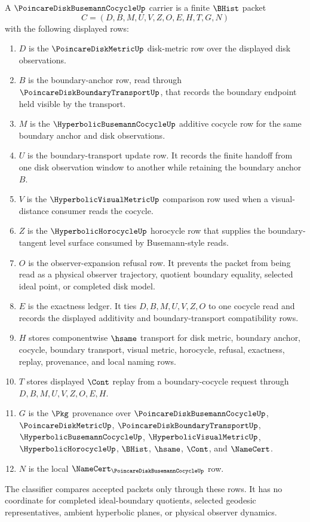 \begin{definition}
\label{def:poincare-disk-busemann-cocycle-carrier}
A $\PoincareDiskBusemannCocycleUp$ carrier is a finite $\BHist$ packet
$$
C=(D,B,M,U,V,Z,O,E,H,T,G,N)
$$
with the following displayed rows:
\begin{enumerate}
\item $D$ is the $\PoincareDiskMetricUp$ disk-metric row over the displayed disk observations.
\item $B$ is the boundary-anchor row, read through $\PoincareDiskBoundaryTransportUp$, that records the boundary endpoint held visible by the transport.
\item $M$ is the $\HyperbolicBusemannCocycleUp$ additive cocycle row for the same boundary anchor and disk observations.
\item $U$ is the boundary-transport update row. It records the finite handoff from one disk observation window to another while retaining the boundary anchor $B$.
\item $V$ is the $\HyperbolicVisualMetricUp$ comparison row used when a visual-distance consumer reads the cocycle.
\item $Z$ is the $\HyperbolicHorocycleUp$ horocycle row that supplies the boundary-tangent level surface consumed by Busemann-style reads.
\item $O$ is the observer-expansion refusal row. It prevents the packet from being read as a physical observer trajectory, quotient boundary equality, selected ideal point, or completed disk model.
\item $E$ is the exactness ledger. It ties $D,B,M,U,V,Z,O$ to one cocycle read and records the displayed additivity and boundary-transport compatibility rows.
\item $H$ stores componentwise $\hsame$ transport for disk metric, boundary anchor, cocycle, boundary transport, visual metric, horocycle, refusal, exactness, replay, provenance, and local naming rows.
\item $T$ stores displayed $\Cont$ replay from a boundary-cocycle request through $D,B,M,U,V,Z,O,E,H$.
\item $G$ is the $\Pkg$ provenance over $\PoincareDiskBusemannCocycleUp$, $\PoincareDiskMetricUp$, $\PoincareDiskBoundaryTransportUp$, $\HyperbolicBusemannCocycleUp$, $\HyperbolicVisualMetricUp$, $\HyperbolicHorocycleUp$, $\BHist$, $\hsame$, $\Cont$, and $\NameCert$.
\item $N$ is the local $\NameCert_{\PoincareDiskBusemannCocycleUp}$ row.
\end{enumerate}
The classifier compares accepted packets only through these rows. It has no coordinate for completed ideal-boundary quotients, selected geodesic representatives, ambient hyperbolic planes, or physical observer dynamics.
\end{definition}

